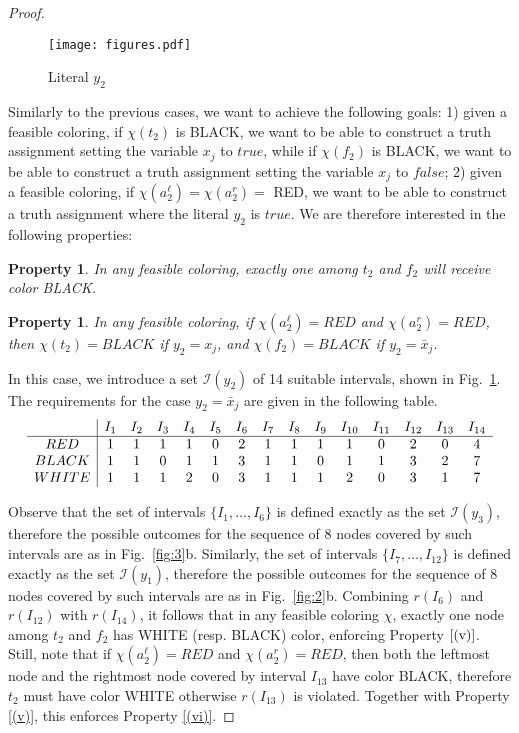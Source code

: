 \documentclass[a4paper,11pt]{article}
\theoremstyle{theorem}
\newtheorem{property}[theorem]{Property}
\begin{document}
\begin{proof}
\begin{figure}[htb]
\centering
\texttt{[image: figures.pdf]} 
\caption{Literal $y_2$}
\label{fig:4}
\end{figure}

Similarly to the previous cases, we want to achieve the following goals: 1) given a feasible coloring, if $\chi(t_2)$ is BLACK, we want to be able to construct a truth assignment setting the variable $x_j$ to $true$, while if $\chi(f_2)$ is BLACK, we want to be able to construct a truth assignment setting the variable $x_j$ to $false$; 2) given a feasible coloring, if $\chi(a_2^{\ell})=\chi(a_2^r)=$ RED, we want to be able to construct a truth assignment where the literal $y_2$ is $true$. We are therefore interested in the following properties:

\begin{property}\label{(v)}
In any feasible coloring, exactly one among $t_2$ and $f_2$ will receive color BLACK.
\end{property}
 
\begin{property}\label{(vi)}
In any feasible coloring, if $\chi(a_2^{\ell}) = RED$ and $\chi(a_2^r) = RED$, then $\chi(t_2) = BLACK$ if $y_2 = x_j$, and $\chi(f_2) = BLACK$ if $y_2 = \bar x_j$. 
\end{property}

\noindent In this case, we introduce a set $\mathcal I(y_2)$ of 14 suitable intervals, shown in Fig.~\ref{fig:4}. 
The requirements for the case $y_2 = \bar x_j$ are given in the following table.
\[
\setlength{\arraycolsep}{1.75mm}
\begin{array}{c|cccccccccccccc}
          & I_1 & I_2 & I_3 & I_4 & I_5 & I_6 & I_7 &  I_8 & I_9 & I_{10} & I_{11} & I_{12} & I_{13} & I_{14} \\ \hline
RED     & 1 & 1 & 1 & 1 & 0 & 2 & 1 & 1 & 1 & 1 & 0 & 2 & 0 & 4 \\
BLACK & 1 & 1 & 0 & 1 & 1 & 3 & 1 & 1 & 0 & 1 & 1 & 3 & 2 & 7 \\
WHITE & 1 & 1 & 1 & 2 & 0 & 3 & 1 & 1 & 1 & 2 & 0 & 3 & 1 & 7 
\end{array}
\]

\noindent Observe that the set of intervals $\{I_1, \dots, I_6 \}$ is defined exactly as the set $\mathcal I(y_3)$, therefore the possible outcomes for the sequence of 8 nodes covered by such intervals are as in Fig.~\ref{fig:3}b.  
Similarly, the set of intervals $\{I_7, \dots, I_{12} \}$ is defined exactly as the set $\mathcal I(y_1)$, therefore the possible outcomes for the sequence of 8 nodes covered by such intervals are as in Fig.~\ref{fig:2}b.  
Combining $r(I_6)$ and $r(I_{12})$ with $r(I_{14})$, it follows that in any feasible coloring $\chi$, exactly one node among $t_2$ and $f_2$ has WHITE (resp. BLACK) color, 
enforcing Property $\eqref{(v)}$.
Still, note that if $\chi(a_2^{\ell}) = RED$ and $\chi(a_2^r) = RED$, then both the leftmost node and the rightmost node covered by interval $I_{13}$ have color BLACK, therefore $t_2$ must have color WHITE otherwise $r(I_{13})$ is violated. Together with Property  \eqref{(v)}, this enforces Property \eqref{(vi)}.  


\end{proof}
\end{document}

